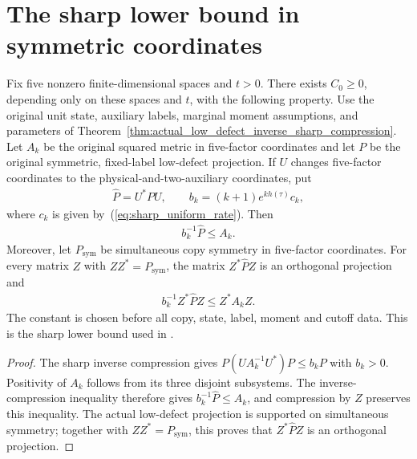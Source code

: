 \section{The sharp lower bound in symmetric coordinates}

\begin{theorem}
  \label{thm:actual_low_defect_sharp_lower_bound}
  \leanok
  Fix five nonzero finite-dimensional spaces and $t>0$.
  There exists $C_0\geq0$, depending only on these spaces and $t$,
  with the following property.
  Use the original unit state, auxiliary labels, marginal moment
  assumptions, and parameters of
  Theorem~\ref{thm:actual_low_defect_inverse_sharp_compression}.
  Let $A_k$ be the original squared metric in five-factor coordinates
  and let $P$ be the original symmetric, fixed-label low-defect
  projection. If $U$ changes five-factor coordinates to the
  physical-and-two-auxiliary coordinates, put
  \begin{align*}
    \widehat P=U^*PU,\qquad
    b_k=(k+1)e^{kh(\tau)}c_k,
  \end{align*}
  where $c_k$ is given by~(\ref{eq:sharp_uniform_rate}).
  Then
  \begin{align*}
    b_k^{-1}\widehat P\leq A_k.
  \end{align*}
  Moreover, let $P_{\mathrm{sym}}$ be simultaneous copy symmetry
  in five-factor coordinates. For every matrix $Z$ with
  $ZZ^*=P_{\mathrm{sym}}$, the matrix $Z^*\widehat PZ$ is an
  orthogonal projection and
  \begin{align*}
    b_k^{-1}Z^*\widehat PZ\leq Z^*A_kZ.
  \end{align*}
  The constant is chosen before all copy, state, label, moment and
  cutoff data. This is the sharp lower bound used in
  \cite[Section~8]{OpenAI2026AreaLaw}.
\end{theorem}
\begin{proof}
  \leanok
  The sharp inverse compression gives
  $P(UA_k^{-1}U^*)P\leq b_kP$ with $b_k>0$.
  Positivity of $A_k$ follows from its three disjoint subsystems.
  The inverse-compression inequality therefore gives
  $b_k^{-1}\widehat P\leq A_k$, and compression by $Z$ preserves
  this inequality.
  The actual low-defect projection is supported on simultaneous
  symmetry; together with $ZZ^*=P_{\mathrm{sym}}$, this proves
  that $Z^*\widehat PZ$ is an orthogonal projection.
\end{proof}
